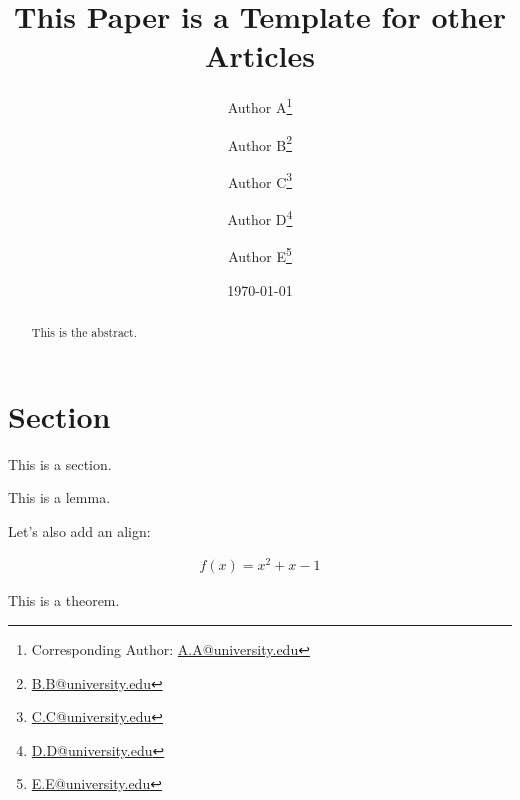 \documentclass{article}
\begin{document}
\title{This Paper is a Template for other Articles}

\author[1]{Author A\thanks{Corresponding Author: \href{mailto:A.A@university.edu}{A.A@university.edu}}}
\author[1]{Author B\thanks{\href{mailto:B.B@university.edu}{B.B@university.edu}}}
\author[1]{Author C\thanks{\href{mailto:C.C@university.edu}{C.C@university.edu}}}
\author[2]{Author D\thanks{\href{mailto:D.D@university.edu}{D.D@university.edu}}}
\author[2]{Author E\thanks{\href{mailto:E.E@university.edu}{E.E@university.edu}}}
\setcounter{Maxaffil}{0}
\renewcommand\Affilfont{\itshape\small}

\date{\today}

\maketitle

\begin{abstract}
This is the abstract.
\end{abstract}

\section{Section}\label{sec:First-section}
This is a section.

\begin{lem}\label{lem:First-lemma}
This is a lemma.

\end{lem}

Let's also add an align:

%
\begin{align}\label{eq:First-equation}
f(x) = x^2+x-1
\end{align}


\begin{thm}\label{thm:First-theorem}
This is a theorem.

\end{thm}
\end{document}
